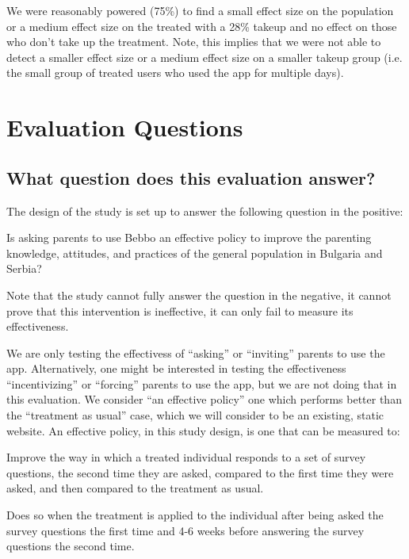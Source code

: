 \message{ !name(bebbo.tex)}\documentclass{article}
\begin{document}
We were reasonably powered (75\%) to find a small effect size on the population or a medium effect size on the treated with a 28\% takeup and no effect on those who don't take up the treatment. Note, this implies that we were not able to detect a smaller effect size or a medium effect size on a smaller takeup group (i.e. the small group of treated users who used the app for multiple days).

\section{Evaluation Questions}

\subsection*{What question does this evaluation answer?}
The design of the study is set up to answer the following question in the positive:

\begin{displayquote}
Is asking parents to use Bebbo an effective policy to improve the parenting knowledge, attitudes, and practices of the general population in Bulgaria and Serbia?
\end{displayquote}

\noindent Note that the study cannot fully answer the question in the negative, it cannot prove that this intervention is ineffective, it can only fail to measure its effectiveness.

We are only testing the effectivess of ``asking'' or ``inviting'' parents to use the app. Alternatively, one might be interested in testing the effectiveness ``incentivizing'' or ``forcing'' parents to use the app, but we are not doing that in this evaluation. We consider ``an effective policy'' one which performs better than the ``treatment as usual'' case, which we will consider to be an existing, static website. An effective policy, in this study design, is one that can be measured to:


Improve the way in which a treated individual responds to a set of survey questions, the second time they are asked, compared to the first time they were asked, and then compared to the treatment as usual.

Does so when the treatment is applied to the individual after being asked the survey questions the first time and 4-6 weeks before answering the survey questions the second time.
\end{document}
